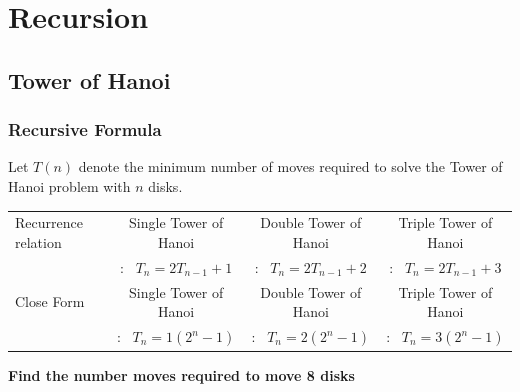 \chapter{Recursion}

\section{Tower of Hanoi}

\subsection*{Recursive Formula}
Let $T(n)$ denote the minimum number of moves required to solve the Tower of Hanoi problem with $n$ disks.

\begin{tabular}{@{}lccc}
   Recurrence relation
   & Single Tower of Hanoi
   & Double Tower of Hanoi
   & Triple Tower of Hanoi \\
   &: \ $T_n = 2T_{n-1} + 1$
   &: \ $T_n = 2T_{n-1} + 2$
   &: \ $T_n = 2T_{n-1} + 3$\\[1em]
   
   Close Form
   & Single Tower of Hanoi
   & Double Tower of Hanoi
   & Triple Tower of Hanoi \\
   &: \ $T_n = 1\left(2^n - 1\right)$
   &: \ $T_n = 2\left(2^n - 1\right)$
   &: \ $T_n = 3\left(2^n - 1\right)$
\end{tabular}


\vspace{1em}
\textbf{Find the number moves required to move 8 disks}
\begin{center}
\end{center}

